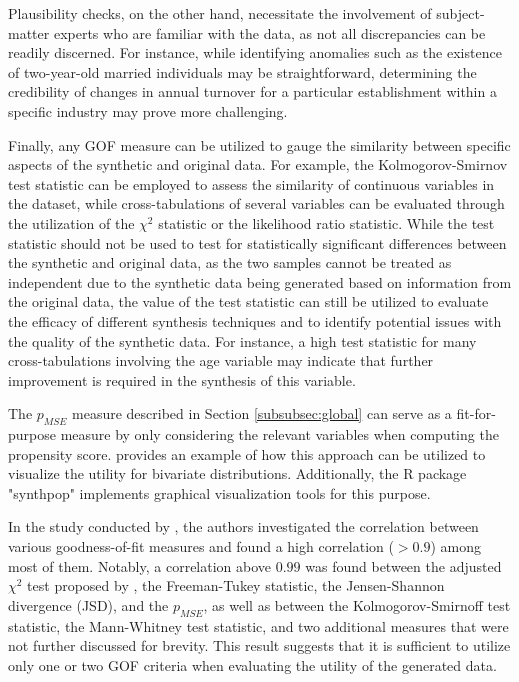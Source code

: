 Plausibility checks, on the other hand, necessitate the involvement of subject-matter experts who are familiar with the data, as not all discrepancies can be readily discerned. For instance, while identifying anomalies such as the existence of two-year-old married individuals may be straightforward, determining the credibility of changes in annual turnover for a particular establishment within a specific industry may prove more challenging.

Finally, any GOF measure can be utilized to gauge the similarity between specific aspects of the synthetic and original data. For example, the Kolmogorov-Smirnov test statistic can be employed to assess the similarity of continuous variables in the dataset, while cross-tabulations of several variables can be evaluated through the utilization of the $\chi^2$ statistic or the likelihood ratio statistic. While the test statistic should not be used to test for statistically significant differences between the synthetic and original data, as the two samples cannot be treated as independent due to the synthetic data being generated based on information from the original data, the value of the test statistic can still be utilized to evaluate the efficacy of different synthesis techniques and to identify potential issues with the quality of the synthetic data. For instance, a high test statistic for many cross-tabulations involving the age variable may indicate that further improvement is required in the synthesis of this variable.

The $p_{MSE}$ measure described in Section \ref{subsubsec:global} can serve as a fit-for-purpose measure by only considering the relevant variables when computing the propensity score. \citet{raab2021assessing} provides an example of how this approach can be utilized to visualize the utility for bivariate distributions. Additionally, the R package "synthpop" implements graphical visualization tools for this purpose.

In the study conducted by \citet{raab2021assessing}, the authors investigated the correlation between various goodness-of-fit measures and found a high correlation ($>0.9$) among most of them. Notably, a correlation above $0.99$ was found between the adjusted $\chi^2$ test proposed by \citet{voas2001evaluating}, the Freeman-Tukey statistic, the Jensen-Shannon divergence (JSD), and the $p_{MSE}$, as well as between the Kolmogorov-Smirnoff test statistic, the Mann-Whitney test statistic, and two additional measures that were not further discussed for brevity. This result suggests that it is sufficient to utilize only one or two GOF criteria when evaluating the utility of the generated data.


